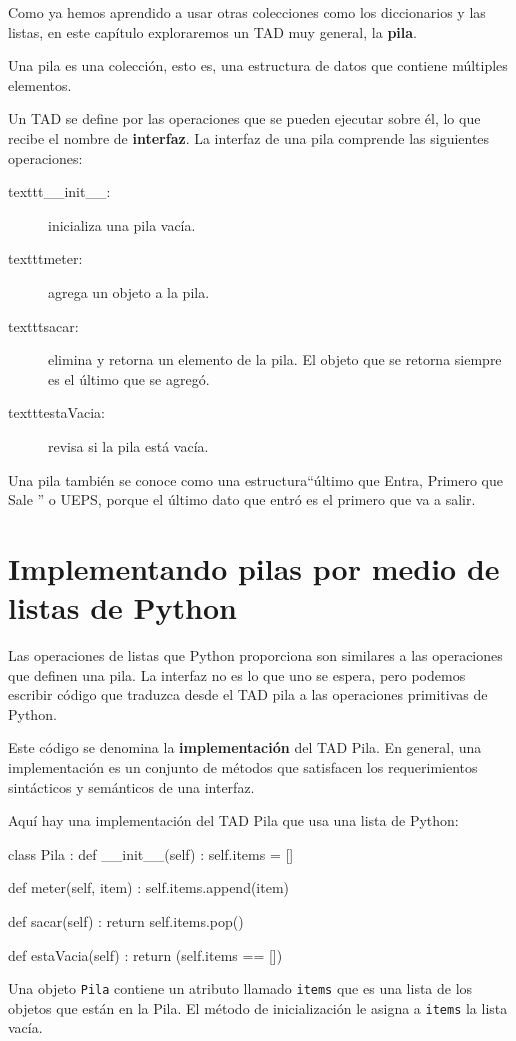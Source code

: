   

Como ya hemos aprendido a usar otras colecciones como los diccionarios
y las listas, en este capítulo exploraremos un TAD muy general, la
\textbf{pila}.

Una pila es una colección, esto es, una estructura de datos que contiene
múltiples elementos. 

Un TAD se define por las operaciones que se pueden ejecutar sobre
él, lo que recibe el nombre de \textbf{interfaz}. La interfaz de una
pila comprende las siguientes operaciones:
\begin{description}
\item [{texttt{\_\_init\_\_}:}] inicializa una pila vacía.
\item [{texttt{meter}:}] agrega un objeto a la pila.
\item [{texttt{sacar}:}] elimina y retorna un elemento de la pila. El
objeto que se retorna siempre es el último que se agregó.
\item [{texttt{estaVacia}:}] revisa si la pila está vacía.
\end{description}
Una pila también se conoce como una estructura``último que Entra,
Primero que Sale '' o UEPS, porque el último dato que entró es el
primero que va a salir.

\section{Implementando pilas por medio de listas de Python}

  

Las operaciones de listas que Python proporciona son similares a las
operaciones que definen una pila. La interfaz no es lo que uno se
espera, pero podemos escribir código que traduzca desde el TAD pila
a las operaciones primitivas de Python.

Este código se denomina la \textbf{implementación} del TAD Pila. En
general, una implementación es un conjunto de métodos que satisfacen
los requerimientos sintácticos y semánticos de una interfaz.

Aquí hay una implementación del TAD Pila que usa una lista de Python:

\beforeverb 
\begin{pythoncode}
class Pila :
  def __init__(self) :
    self.items = []

  def meter(self, item) :
    self.items.append(item)

  def sacar(self) :
    return self.items.pop()

  def estaVacia(self) :
    return (self.items == [])
\end{pythoncode}
\afterverb Una objeto \texttt{Pila} contiene un atributo llamado
\texttt{items} que es una lista de los objetos que están en la Pila.
El método de inicialización le asigna a \texttt{items} la lista vacía.

